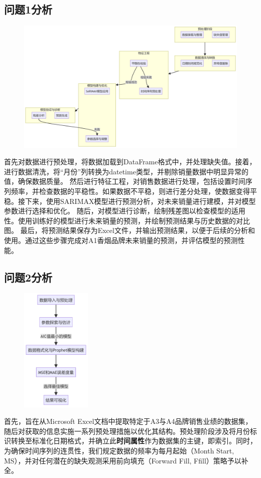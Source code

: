 \documentclass[a4paper]{article}
\begin{document}
	\subsection{问题1分析}
		\begin{figure}[H]
			\centering
			\includegraphics[width=1.0\textwidth]{img/Q1_analysis.png}
		\end{figure}
	首先对数据进行预处理，将数据加载到DataFrame格式中，并处理缺失值。接着，进行数据清洗，将“月份”列转换为datetime类型，并剔除销量数据中明显异常的值，确保数据质量。
然后进行特征工程，对销售数据进行处理，包括设置时间序列频率，并检查数据的平稳性。如果数据不平稳，则进行差分处理，使数据变得平稳。接下来，使用SARIMAX模型进行预测分析，对未来销量进行建模，并对模型参数进行选择和优化。
随后，对模型进行诊断，绘制残差图以检查模型的适用性。使用训练好的模型进行未来销量的预测，并绘制预测结果与历史数据的对比图。
最后，将预测结果保存为Excel文件，并输出预测结果，以便于后续的分析和使用。通过这些步骤完成对A1香烟品牌未来销量的预测，并评估模型的预测性能。
	\subsection{问题2分析}
		\begin{figure}[H]
		\centering
		\includegraphics[width=0.3\textwidth]{img/Q2_analysis.png}
	\end{figure}
首先，旨在从Microsoft Excel文档中提取特定于A3与A4品牌销售业绩的数据集，随后对获取的信息实施一系列预处理措施以优化其结构。预处理阶段涉及将月份标识转换至标准化日期格式，并确立此\textbf{时间属性}作为数据集的主键，即索引。同时，为确保时间序列的连贯性，我们规定数据的频率为每月起始（Month Start, MS），并对任何潜在的缺失观测采用前向填充（Forward Fill, Ffill）策略予以补全。
\end{document}
